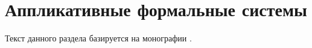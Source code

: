 \chapter{Аппликативные формальные системы}

Текст данного раздела базируется на монографии \cite{Pierce}.





